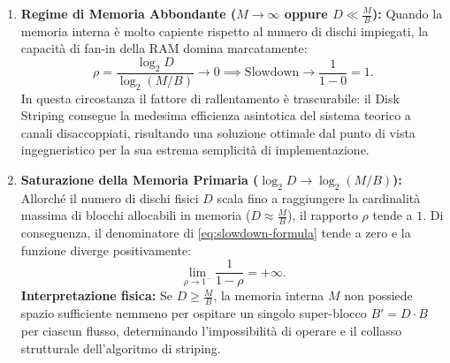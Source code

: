 \begin{enumerate}
  \item \textbf{Regime di Memoria Abbondante ($M \to \infty$ oppure $D \ll \frac{M}{B}$):}
  Quando la memoria interna è molto capiente rispetto al numero di dischi impiegati, la capacità di fan-in della RAM domina marcatamente:
  \begin{equation}
    \rho = \frac{\log_2 D}{\log_2(M / B)} \to 0 \implies \text{Slowdown} \to \frac{1}{1 - 0} = 1.
  \end{equation}
  In questa circostanza il fattore di rallentamento è trascurabile: il Disk Striping consegue la medesima efficienza asintotica del sistema teorico a canali disaccoppiati, risultando una soluzione ottimale dal punto di vista ingegneristico per la sua estrema semplicità di implementazione.

  \item \textbf{Saturazione della Memoria Primaria ($\log_2 D \to \log_2(M/B)$):}
  Allorché il numero di dischi fisici $D$ scala fino a raggiungere la cardinalità massima di blocchi allocabili in memoria ($D \approx \frac{M}{B}$), il rapporto $\rho$ tende a $1$. Di conseguenza, il denominatore di \eqref{eq:slowdown-formula} tende a zero e la funzione diverge positivamente:
  \begin{equation}
    \lim_{\rho \to 1^-} \frac{1}{1 - \rho} = +\infty.
  \end{equation}
  \textbf{Interpretazione fisica:} Se $D \ge \frac{M}{B}$, la memoria interna $M$ non possiede spazio sufficiente nemmeno per ospitare un singolo super-blocco $B' = D \cdot B$ per ciascun flusso, determinando l'impossibilità di operare e il collasso strutturale dell'algoritmo di striping.
\end{enumerate}

